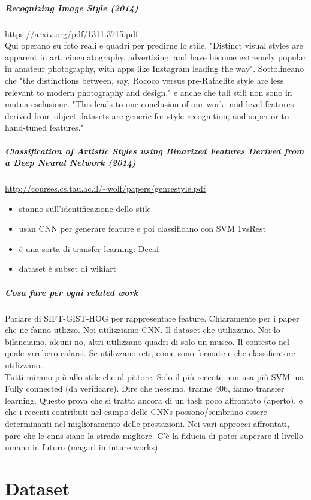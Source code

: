 \documentclass{article}
\begin{document}
\subparagraph{Recognizing Image Style (2014)}
\url{https://arxiv.org/pdf/1311.3715.pdf} \\
Qui operano su foto reali e quadri per predirne lo stile. "Distinct visual styles are apparent in art, cinematography, advertising, and have become extremely popular in amateur photography, with apps like Instagram leading the way". Sottolineano che "the distinctions between, say, Rococo versus pre-Rafaelite style are less relevant to modern photography and design." e anche che tali stili non sono in mutua esclusione. "This leads to one
conclusion of our work: mid-level features derived from object datasets are generic for style
recognition, and superior to hand-tuned features."

\subparagraph{Classification of Artistic Styles using Binarized
	Features Derived from a Deep Neural Network (2014)}\url{http://courses.cs.tau.ac.il/~wolf/papers/genrestyle.pdf}\\
\begin{itemize}
	\item stanno sull'identificazione dello stile
	\item usan CNN per generare feature e poi classificano con SVM 1vsRest
	\item è una sorta di transfer learning: Decaf
	\item dataset è subset di wikiart
\end{itemize}

\subparagraph{Cosa fare per ogni related work}

Parlare di SIFT-GIST-HOG per rappresentare feature. Chiaramente per i paper che ne fanno utlizzo. Noi utilizziamo CNN. Il dataset che utilizzano. Noi lo bilanciamo, alcuni no, altri utilizzano quadri di solo un museo. Il contesto nel quale vrrebero calarsi. Se utilizzano reti, come sono formate e che classificatore utilizzano. \\
Tutti mirano più allo stile che al pittore. Solo il più recente non usa più SVM ma Fully connected (da verificare). Dire che nessuno, tranne 406, fanno transfer learning. Questo prova che si tratta ancora di un task poco affrontato (aperto), e che i recenti contributi nel campo delle CNNs possono/sembrano essere determinanti nel miglioramento delle prestazioni. Nei vari approcci affrontati, pare che le cnns siano la strada migliore. C'è la fiducia di poter superare il livello umano in futuro (magari in future works).
\section{Dataset}
\end{document}
